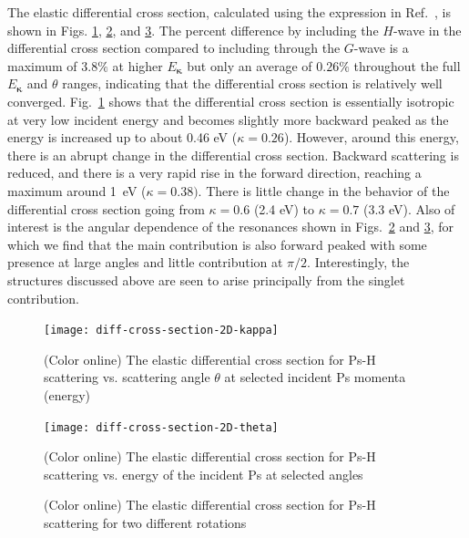 \documentclass[preprint,showpacs,showkeys,preprintnumbers,amsmath,amssymb,longbibliography,pra,aps]{revtex4-1}
\begin{document}
{The elastic differential cross section, calculated using the expression in
Ref.~\cite{Bransden2003}, is shown in Figs.
\ref{fig:diff-cross-section-2D-kappa}, \ref{fig:diff-cross-section-2D-theta},
and \ref{fig:combined-diff-cross-sections}. The percent difference by including
the $H$-wave in the differential cross section compared to including through
the $G$-wave is a maximum of $3.8\%$ at higher $E_{\bm \kappa}$
but only an average of $0.26\%$ throughout the full
$E_{\bm \kappa}$ and $\theta$ ranges, indicating that the differential cross section
is relatively well converged. Fig.~\ref{fig:diff-cross-section-2D-kappa} shows
that the differential cross section is essentially
isotropic at very low incident energy and becomes slightly more backward peaked 
as the energy is increased up to about 0.46 eV ($\kappa = 0.26$). 
However, around this energy, there is an abrupt change in the differential 
cross section. Backward scattering is reduced, and there is a very rapid
rise in the forward direction, reaching a maximum 
around 1~eV ($\kappa = 0.38)$.
There is little change in the behavior of the differential cross section
going from $\kappa = 0.6$ (2.4 eV) to $\kappa = 0.7$ (3.3 eV).
Also of interest is the angular dependence of the resonances shown in
Figs.~\ref{fig:diff-cross-section-2D-theta} and 
\ref{fig:combined-diff-cross-sections}, for which we find that the main 
contribution is also forward peaked with some presence at large angles and 
little contribution at $\pi/2$.
Interestingly, the structures discussed above are seen to arise principally
from the singlet contribution.

\begin{figure}[H]
	\centering
	\texttt{[image: diff-cross-section-2D-kappa]}
	\caption{(Color online) The elastic differential cross section for Ps-H
scattering vs. scattering angle $\theta$ at selected incident Ps momenta (energy)}
	\label{fig:diff-cross-section-2D-kappa}
\end{figure}

\begin{figure}[H]
	\centering
	\texttt{[image: diff-cross-section-2D-theta]}
	\caption{(Color online) The elastic differential cross section for Ps-H
scattering vs. energy of the incident Ps at selected angles}
	\label{fig:diff-cross-section-2D-theta}
\end{figure}

\begin{figure}[H]%
    \centering
    \caption{(Color online) The elastic differential cross section for Ps-H scattering for two different rotations}%
    \label{fig:combined-diff-cross-sections}%
\end{figure}

}
\end{document}
